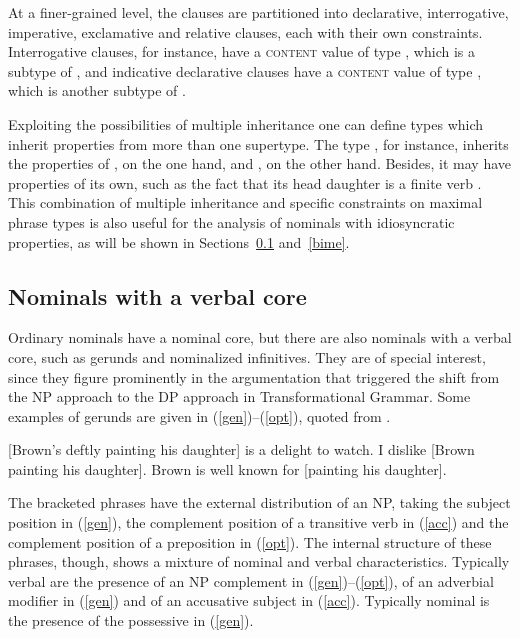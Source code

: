\documentclass[output=paper
	        ,collection
	        ,collectionchapter
 	        ,biblatex
                ,babelshorthands
                ,newtxmath
                ,draftmode
                ,colorlinks, citecolor=brown
]{langscibook}
\begin{document}
\noindent
At a finer-grained level, the clauses are partitioned into 
declarative, interrogative, imperative, exclamative and relative
clauses, each with their own constraints. 
Interrogative clauses, for instance, have a \textsc{content} value of type 
, which is a subtype of , and 
indicative declarative clauses have a \textsc{content} value of type 
, which is another subtype of .

Exploiting the possibilities of multiple inheritance one can 
define types which inherit properties from more than one supertype. 
The type , for instance, inherits 
the properties of , on the one hand, and 
, on the other hand. Besides, it may 
have properties of its own, such as the fact that its head daughter 
is a finite verb \citep[43]{GS00}. 
This combination of multiple inheritance and specific   
constraints on maximal phrase types is also useful for the analysis of 
nominals with idiosyncratic properties, as will be shown in Sections~\ref{geru} 
and~\ref{bime}. 


\subsection{Nominals with a verbal core} 
\label{geru}


Ordinary nominals have a nominal core, but there are also nominals  
with a verbal core, such as gerunds and nominalized infinitives. They are 
of special interest, since they figure prominently in the argumentation 
that triggered the shift from the NP approach to the DP approach in Transformational 
Grammar. Some examples of gerunds are given in (\ref{gen})--(\ref{opt}), 
quoted from \citet[1290]{Quirketal85}. 

\begin{exe} 
\ex\label{gen}  {}[Brown's deftly painting his daughter] is a delight to watch. 
\ex\label{acc}  I dislike [Brown painting his daughter]. 
\ex\label{opt}  Brown is well known for [painting his daughter].
\end{exe}

\noindent
The bracketed phrases have the external distribution of an NP, 
taking the subject position in (\ref{gen}), 
the complement position of a transitive verb in (\ref{acc}) and 
the complement position of a preposition in (\ref{opt}). 
The internal structure of these phrases, though, shows a mixture of nominal and verbal 
characteristics. 
Typically verbal are the presence of an NP complement in (\ref{gen})--(\ref{opt}), 
of an adverbial modifier in (\ref{gen}) and of an accusative subject in (\ref{acc}). 
Typically nominal is the presence of the possessive in (\ref{gen}). 
\end{document}
